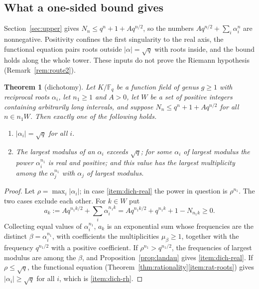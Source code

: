 \documentclass[11pt]{amsbook}
\theoremstyle{plain}
\newtheorem{theorem}{Theorem}[section]
\theoremstyle{definition}
\theoremstyle{remark}
\numberwithin{equation}{section}
\numberwithin{figure}{chapter}
\numberwithin{table}{chapter}
\newcommand{\F}{\mathbb{F}}
\begin{document}
\subsection{What a one-sided bound gives}

Section~\ref{sec:upper} gives $N_n\le q^n+1+Aq^{n/2}$, so the
numbers $Aq^{n/2}+\sum_i\alpha_i^n$ are nonnegative. Positivity
confines the first singularity to the real axis, the functional
equation pairs roots outside $\lvert\alpha\rvert=\sqrt q$ with
roots inside, and the bound holds along the whole tower. These
inputs do not prove the Riemann hypothesis
(Remark~\ref{rem:route2}).

\begin{theorem}[dichotomy]\label{thm:dichotomy}
Let $K/\F_q$ be a function field of genus $g\ge1$ with reciprocal
roots $\alpha_i$, let $n_1\ge1$ and $A>0$, let $W$ be a set of
positive integers containing arbitrarily long intervals, and
suppose $N_n\le q^n+1+Aq^{n/2}$ for all $n\in n_1W$. Then exactly
one of the following holds.
\begin{enumerate}
\item\label{item:dich-rh} $\lvert\alpha_i\rvert=\sqrt q$ for all
$i$.
\item\label{item:dich-real} The largest modulus of an $\alpha_i$
exceeds $\sqrt q$; for some $\alpha_i$ of largest modulus the power
$\alpha_i^{n_1}$ is real and positive; and this value has the
largest multiplicity among the $\alpha_j^{n_1}$ with $\alpha_j$ of
largest modulus.
\end{enumerate}
\end{theorem}

\begin{proof}
Let $\rho=\max_i\lvert\alpha_i\rvert$; in case
\eqref{item:dich-real} the power in question is $\rho^{n_1}$. The
two cases exclude each other. For $k\in W$ put
\[
a_k:=Aq^{n_1k/2}+\sum_i\alpha_i^{n_1k}
=Aq^{n_1k/2}+q^{n_1k}+1-N_{n_1k}\ge0.
\]
Collecting equal values of $\alpha_i^{n_1}$, $a_k$ is an
exponential sum whose frequencies are the distinct
$\beta=\alpha_i^{n_1}$, with coefficients the multiplicities
$\mu_\beta\ge1$, together with the frequency $q^{n_1/2}$ with a
positive coefficient. If $\rho^{n_1}>q^{n_1/2}$, the frequencies of
largest modulus are among the $\beta$, and
Proposition~\ref{prop:landau} gives \eqref{item:dich-real}. If
$\rho\le\sqrt q$, the functional equation
(Theorem~\ref{thm:rationality}\eqref{item:rat-roots}) gives
$\lvert\alpha_i\rvert\ge\sqrt q$ for all $i$, which is
\eqref{item:dich-rh}.
\end{proof}
\end{document}
